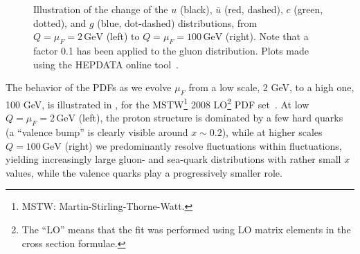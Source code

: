 \begin{figure}[t]
\caption{Illustration of the change of the $u$ (black), $\bar{u}$ (red, dashed),
 $c$ (green, dotted), and $g$ (blue, dot-dashed) distributions, from 
$Q=\mu_F= 2\,\mathrm{GeV}$ (left) to $Q = \mu_F = 100\,\mathrm{GeV}$ (right). 
Note that a factor 0.1 has been
 applied to the gluon distribution. Plots made using the HEPDATA online
 tool~\cite{Buckley:2010jn}.\label{fig:pdfEvol}}
\end{figure}
%
%
The behavior 
of the PDFs as we evolve $\mu_F$ from a low scale, 2 GeV, to a high one, 100
GeV, is illustrated in , 
for the MSTW\footnote{MSTW: Martin-Stirling-Thorne-Watt.} 2008
LO\footnote{The ``LO'' means 
that the fit was performed using LO matrix elements in the cross section
formulae.} PDF set~\cite{Martin:2009iq}. At low
$Q=\mu_F = 2\,\mathrm{GeV}$ (left), the proton structure is dominated by a few hard
quarks (a ``valence bump'' is clearly visible around $x \sim 0.2$), 
while at
higher scales $Q = 100\,\mathrm{GeV}$ (right) we predominantly resolve fluctuations
within fluctuations, yielding increasingly large gluon- and sea-quark
distributions with rather small $x$ values, while the valence quarks play
a progressively smaller role.

